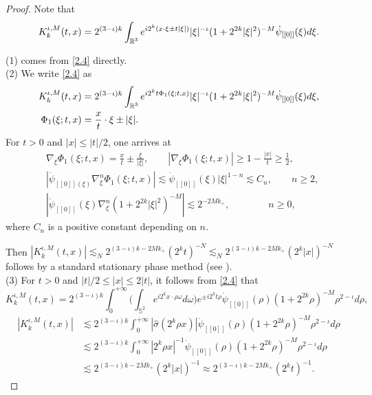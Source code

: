 \documentclass[11pt,twoside]{article}
\def\R{\mathop{\mathbb R\kern 0pt}\nolimits}
\def\f{\frac}
\def\ls{\lesssim}
\theoremstyle{plain}
\theoremstyle{definition}
\numberwithin{equation}{section}
\begin{document}
	\begin{proof}
		Note that
		\begin{equation}\label{2.4}
			K_k^{\iota,M}(t,x)=2^{(3-\iota)k}\int_{\R^3}e^{i2^k(x\cdot\xi\pm t|\xi|)}|\xi|^{-\iota}(1+2^{2k}|\xi|^2)^{-M}\dot{\psi}_{[[0]]}(\xi)d\xi.
		\end{equation}

		(1) comes from \eqref{2.4} directly.\\

		(2) We write  \eqref{2.4} as
		\begin{equation*}
			\begin{split}
				K_k^{\iota,M}(t,x)&=2^{(3-\iota)k}\int_{\R^3}e^{i2^kt\Phi_1(\xi;t,x)}|\xi|^{-\iota}(1+2^{2k}|\xi|^2)^{-M}\dot{\psi}_{[[0]]}(\xi)d\xi,\\
				\Phi_1(\xi;t,x)&=\f{x}{t}\cdot\xi \pm |\xi|.
			\end{split}	
		\end{equation*}
		For $t>0$ and $|x|\le |t|/2$, one arrives at
		\begin{equation*}
			\begin{split}
				&\nabla_\xi \Phi_1(\xi;t,x)=\f{x}{t} \pm \f{\xi}{|\xi|},\qquad |\nabla_\xi \Phi_1(\xi;t,x)|\ge 1-\f{|x|}{t}\ge \f{1}{2},\\
				&|\dot{\psi}_{[[0]](\xi)}\nabla_\xi^n \Phi_1(\xi;t,x)|\ls \dot{\psi}_{[[0]]}(\xi)|\xi|^{1-n}\ls C_n,\qquad n\ge 2,\\
				&|\dot{\psi}_{[[0]]}(\xi)\nabla_\xi^n (1+2^{2k}|\xi|^2)^{-M}|\ls 2^{-2Mk_+},\qquad\qquad n\ge 0,
			\end{split}
		\end{equation*}
		where $C_n$ is a positive constant depending on $n$.

Then $|K_k^{\iota,M}(t,x)|\ls_N 2^{(3-\iota)k-2Mk_+}(2^kt)^{-N}\ls_N 2^{(3-\iota)k-2Mk_+}(2^k|x|)^{-N}$ follows by
a standard stationary phase method (see \cite[Chapter 8]{Chemin}).\\

		(3) For $t>0$ and $|t|/2\le |x|\le 2|t|$, it follows from \eqref{2.4} that
		\begin{equation*}
			K_k^{\iota,M}(t,x)=2^{(3-\iota)k}\int_{0}^{+\infty}\big(\int_{\mathbb{S}^{2}}e^{i2^kx\cdot\rho\omega}d\omega\big)e^{\pm i 2^k t\rho}\dot{\psi}_{[[0]]}(\rho)(1+2^{2k}\rho)^{-M} \rho^{2-\iota}d\rho,
		\end{equation*}
		\begin{equation*}
			\begin{split}
				|K_k^{\iota,M}(t,x)|&\ls 2^{(3-\iota)k}\int_{0}^{+\infty}|\hat{\sigma}(2^k\rho x)|\dot{\psi}_{[[0]]}(\rho) (1+2^{2k}\rho)^{-M} \rho^{2-\iota}d\rho\\
				&\ls  2^{(3-\iota)k}\int_{0}^{+\infty}|2^k\rho x|^{-1}\dot{\psi}_{[[0]]}(\rho) (1+2^{2k}\rho)^{-M} \rho^{2-\iota}d\rho\\
				&\ls 2^{(3-\iota)k-2Mk_+}(2^k|x|)^{-1}\approx 2^{(3-\iota)k-2Mk_+}(2^kt)^{-1}.
			\end{split}
		\end{equation*}


\end{proof}
\end{document}
